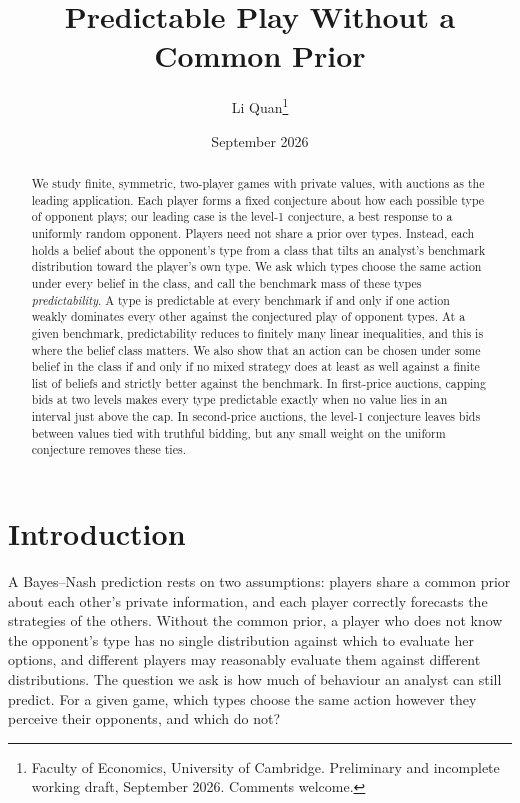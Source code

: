 \documentclass[12pt]{article}
\title{Predictable Play Without a Common Prior}
\author{Li Quan\thanks{Faculty of Economics, University of Cambridge. Preliminary and incomplete working draft, September 2026. Comments welcome.}}
\date{September 2026}
\theoremstyle{definition}
\begin{document}
\maketitle

\begin{abstract}
\noindent We study finite, symmetric, two-player games with private values, with auctions as the leading application. Each player forms a fixed conjecture about how each possible type of opponent plays; our leading case is the level-1 conjecture, a best response to a uniformly random opponent. Players need not share a prior over types. Instead, each holds a belief about the opponent's type from a class that tilts an analyst's benchmark distribution toward the player's own type. We ask which types choose the same action under every belief in the class, and call the benchmark mass of these types \emph{predictability}. A type is predictable at every benchmark if and only if one action weakly dominates every other against the conjectured play of opponent types. At a given benchmark, predictability reduces to finitely many linear inequalities, and this is where the belief class matters. We also show that an action can be chosen under some belief in the class if and only if no mixed strategy does at least as well against a finite list of beliefs and strictly better against the benchmark. In first-price auctions, capping bids at two levels makes every type predictable exactly when no value lies in an interval just above the cap. In second-price auctions, the level-1 conjecture leaves bids between values tied with truthful bidding, but any small weight on the uniform conjecture removes these ties.
\end{abstract}

\section{Introduction}\label{sec:intro}

A Bayes--Nash prediction rests on two assumptions: players share a common prior about each other's private information, and each player correctly forecasts the strategies of the others. Without the common prior, a player who does not know the opponent's type has no single distribution against which to evaluate her options, and different players may reasonably evaluate them against different distributions. The question we ask is how much of behaviour an analyst can still predict. For a given game, which types choose the same action however they perceive their opponents, and which do not?
\end{document}
